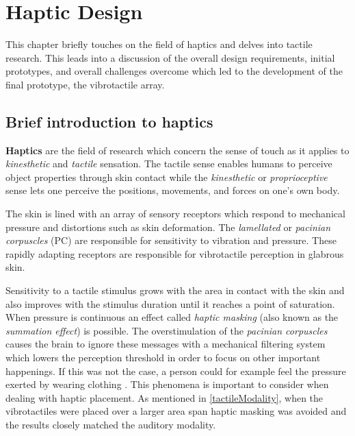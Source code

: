 \chapter{Haptic Design}
This chapter briefly touches on the field of haptics and delves into tactile research. This leads into a discussion of the overall design requirements, initial prototypes, and overall challenges overcome which led to the development of the final prototype, the vibrotactile array.

\section{Brief introduction to haptics}
\textbf{Haptics} are the field of research which concern the sense of touch as it applies to \textit{kinesthetic} and \textit{tactile} sensation. The tactile sense enables humans to perceive object properties through skin contact while the \textit{kinesthetic} or \textit{proprioceptive} sense lets one perceive the positions, movements, and forces on one's own body. 

The skin is lined with an array of sensory receptors which respond to mechanical pressure and distortions such as skin deformation. The \textit{lamellated} or \textit{pacinian corpuscles} (PC) are responsible for sensitivity to vibration and pressure. These rapidly adapting receptors are responsible for vibrotactile perception in glabrous skin. 

Sensitivity to a tactile stimulus grows with the area in contact with the skin and also improves with the stimulus duration until it reaches a point of saturation. When pressure is continuous an effect called \textit{haptic masking} (also known as the \textit{summation effect}) is possible. The overstimulation of the \textit{pacinian corpuscles} causes the brain to ignore these messages with a mechanical filtering system which lowers the perception threshold in order to focus on other important happenings. If this was not the case, a person could for example feel the pressure exerted by wearing clothing \cite{choi2013vibrotactile}. This phenomena is important to consider when dealing with haptic placement. As mentioned in \ref{tactileModality}, when the vibrotactiles were placed over a larger area span haptic masking was avoided and the results closely matched the auditory modality.

